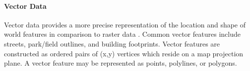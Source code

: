 


\paragraph{Vector Data}

Vector data provides a more precise representation of the location and shape of world features in comparison to raster data \cite{GIS_demystified}. Common vector features include streets, park/field outlines, and building footprints. Vector features are constructed as ordered pairs of (x,y) vertices which reside on a map projection plane.  A vector feature may be represented as points, polylines, or polygons. 


